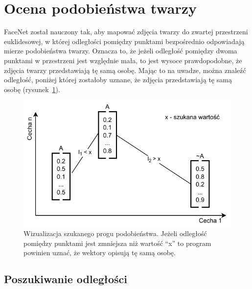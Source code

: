 \section{Ocena podobieństwa twarzy}

FaceNet został nauczony tak, aby mapować zdjęcia twarzy do zwartej przestrzeni euklidesowej,
w której odległości pomiędzy punktami bezpośrednio odpowiadają mierze podobieństwa twarzy.
Oznacza to, że jeżeli odległość pomiędzy dwoma punktami w przestrzeni
jest względnie mała, to jest wysoce prawdopodobne, że zdjęcia twarzy przedstawiają tę samą osobę.
Mając to na uwadze, można znaleźć odległość, poniżej której zostałoby uznane, że zdjęcia
przedstawiają tę samą osobę (rysunek~\ref{fig:szukanie_progu}).

\begin{figure}[H]
    \centering
    \includegraphics[width=1\textwidth]{./images/szukanie_progu}
    \caption{ Wizualizacja szukanego progu podobieństwa. Jeżeli odległość pomiędzy punktami jest
    zmniejsza niż wartość ``x'' to program powinien uznać, że wektory opisują tę samą osobę. }
    \customsource
    \label{fig:szukanie_progu}
\end{figure}

\pagebreak

\subsection{Poszukiwanie odległości}

